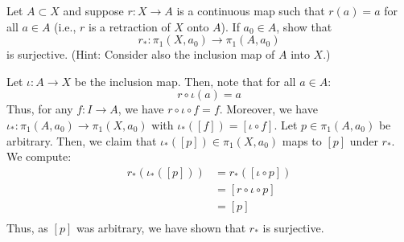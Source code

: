 \documentclass[12pt]{article}
\begin{document}
\begin{problem}{2}
Let \( A \subset X \) and suppose \( r : X \to A \) is a continuous map such that \( r(a) = a \) for all \( a \in A \) (i.e., \( r \) is a retraction of \( X \) onto \( A \)). If \( a_0 \in A \), show that
\[
r_* : \pi_1(X, a_0) \to \pi_1(A, a_0)
\]
is surjective. (Hint: Consider also the inclusion map of \( A \) into \( X \).)
\end{problem}
\begin{solution}
    Let $\iota: A \to X$ be the inclusion map. Then, note that for all $a \in A$: 
    \[ r \circ \iota (a) = a\]    
    Thus, for any $f: I \to A$, we have $r \circ \iota \circ f = f$. Moreover, we have $\iota_*: \pi_1(A, a_0) \to \pi_1(X, a_0)$ with $\iota_*([f]) = [\iota \circ f]$. Let $p \in \pi_1(A, a_0)$ be arbitrary. Then, we claim that $\iota_*([p]) \in \pi_1(X, a_0)$ maps to $[p]$ under $r_*$. We compute:
    \begin{align*}
        r_*(\iota_*([p])) &= r_*([\iota \circ p]) \\
        &= [r \circ \iota \circ p] \\
        &= [p] \\
    \end{align*} 
    Thus, as $[p]$ was arbitrary, we have shown that $r_*$ is surjective.
\end{solution}
\newpage
\end{document}
